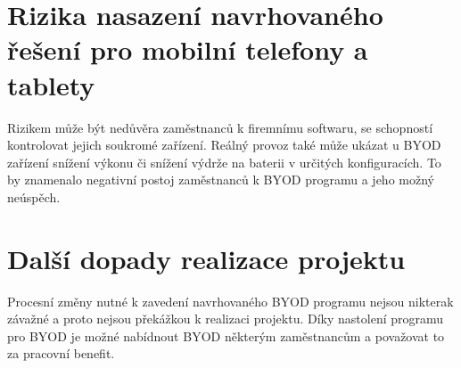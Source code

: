 \section{Rizika nasazení navrhovaného řešení pro mobilní telefony a tablety}
Rizikem může být nedůvěra zaměstnanců k firemnímu softwaru, se schopností kontrolovat jejich soukromé zařízení. Reálný provoz také může ukázat u BYOD zařízení snížení výkonu či snížení výdrže na baterii v určitých konfiguracích. To by znamenalo negativní postoj zaměstnanců k BYOD programu a jeho možný neúspěch.

\section{Další dopady realizace projektu}
Procesní změny nutné k zavedení navrhovaného BYOD programu nejsou nikterak závažné a proto nejsou překážkou k realizaci projektu. Díky nastolení programu pro BYOD je možné nabídnout BYOD některým zaměstnancům a považovat to za pracovní benefit.


